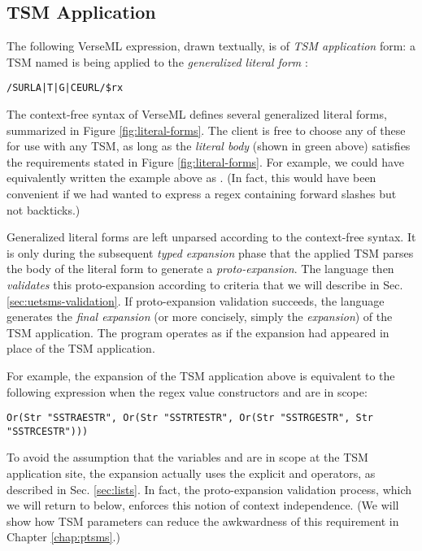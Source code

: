 \subsection{TSM Application}\label{sec:uetsms-usage}
The following VerseML expression, drawn textually, is of \emph{TSM application} form: a TSM named  is being applied to the \emph{generalized literal form} :
\begin{lstlisting}[numbers=none,mathescape=|]
/SURLA|T|G|CEURL/$rx 
\end{lstlisting}
The context-free syntax of VerseML defines several generalized literal forms, summarized in Figure \ref{fig:literal-forms}. The client is free to choose any of these for use with any TSM, as long as the \emph{literal body} (shown in green above) satisfies the requirements stated in Figure \ref{fig:literal-forms}. For example, we could have equivalently written the example above as . (In fact, this would have been convenient if we had wanted to express a regex containing forward slashes but not backticks.) 

Generalized literal forms are left unparsed according to the context-free syntax. It is only during the subsequent \emph{typed expansion} phase that the applied TSM parses the {body} of the literal form to generate a \emph{proto-expansion}. The language then \emph{validates} this proto-expansion according to criteria that we will describe in Sec. \ref{sec:uetsms-validation}. If proto-expansion validation succeeds, the language generates the \emph{final expansion} (or more concisely, simply the \emph{expansion}) of the TSM application. The program operates as if the expansion had appeared in place of the TSM application. 

For example, the expansion of the TSM application above is equivalent to the following expression when the regex value constructors  and  are in scope:
\begin{lstlisting}[numbers=none]
Or(Str "SSTRAESTR", Or(Str "SSTRTESTR", Or(Str "SSTRGESTR", Str "SSTRCESTR")))
\end{lstlisting}
To avoid the assumption that the variables  and  are in scope at the TSM application site, the expansion actually uses the explicit  and  operators, as described in Sec. \ref{sec:lists}. In fact, the proto-expansion validation process, which we will return to below, enforces this notion of context independence. (We will show how TSM parameters can reduce the awkwardness of this requirement in Chapter \ref{chap:ptsms}.)

